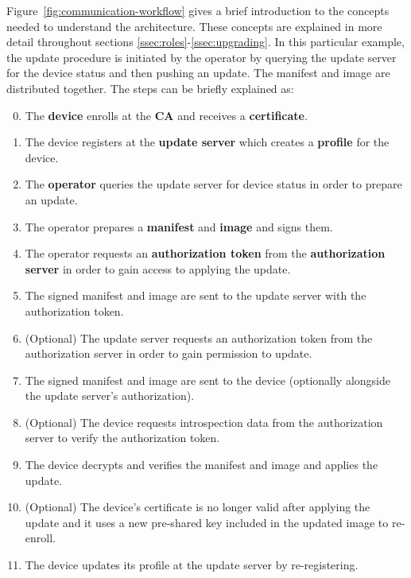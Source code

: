 \documentclass[0-thesis.tex]{subfiles}
\begin{document}
Figure~\ref{fig:communication-workflow} gives a brief introduction to the concepts needed
to understand the architecture. These concepts are explained in more detail throughout
sections \ref{ssec:roles}-\ref{ssec:upgrading}. In this particular example, the update
procedure is initiated by the operator by querying the update server for the device status
and then pushing an update. The manifest and image are distributed together. The steps can
be briefly explained as:

\begin{enumerate}
    \setcounter{enumi}{-1}
    \item The \textbf{device} enrolls at the \textbf{CA} and receives a
            \textbf{certificate}.
    \item The device registers at the \textbf{update server} which creates a \textbf{profile}
            for the device.
    \item The \textbf{operator} queries the update server for device status in order to
            prepare an update.
    \item The operator prepares a \textbf{manifest} and \textbf{image} and signs them.
    \item The operator requests an \textbf{authorization token} from the
            \textbf{authorization server} in order to gain access to applying the update.
    \item The signed manifest and image are sent to the update server with the
            authorization token.
    \item (Optional) The update server requests an authorization token from the
            authorization server in order to gain permission to update.
    \item The signed manifest and image are sent to the device (optionally alongside the
            update server's authorization).
    \item (Optional) The device requests introspection data from the authorization server
            to verify the authorization token.
    \item The device decrypts and verifies the manifest and image and applies the update.
    \item (Optional) The device's certificate is no longer valid after applying the update
            and it uses a new pre-shared key included in the updated image to re-enroll.
    \item The device updates its profile at the update server by re-registering.
\end{enumerate}
\end{document}
